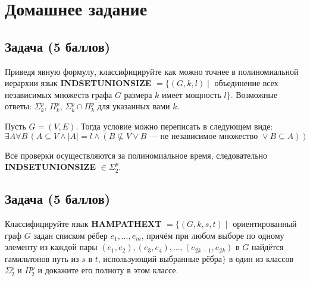 \section{Домашнее задание}

\subsection{\textbf{Задача (5 баллов)}}

Приведя явную формулу, классифицируйте как можно точнее в полиномиальной иерархии язык
\textbf{INDSETUNIONSIZE} $= \{(G, k, l) \mid$ объединение всех независимых множеств графа $G$ размера $k$ имеет мощность $l\}$.
Возможные ответы: $\Sigma_k^p$, $\Pi_k^p$, $\Sigma_k^p \cap \Pi_k^p$ для указанных вами $k$.

\begin{solution}
    Пусть $G = (V, E)$. Тогда условие можно переписать в следующем виде:
    $$\exists A \forall B \, (A \subseteq V \wedge |A| = l \wedge (B \nsubseteq V \vee B \text{ --- не независимое множество } \vee B \subseteq A))$$

    Все проверки осуществляются за полиномиальное время, следовательно \textbf{INDSETUNIONSIZE} $\in \Sigma_2^p$.

\end{solution}


\subsection{Задача \textbf{(5 баллов)}}

Классифицируйте язык \textbf{HAMPATHEXT} $= \{(G, k, s, t) \mid$ ориентированный граф $G$ задан списком рёбер
$e_1, \ldots, e_m$, причём при любом выборе по одному элементу из каждой пары $(e_1, e_2), (e_3, e_4), \ldots, (e_{2k-1}, e_{2k})$
в $G$ найдётся гамильтонов путь из $s$ в $t$, использующий выбранные рёбра$\}$ в один из классов
$\Sigma_2^p$ и $\Pi_2^p$ и докажите его полноту в этом классе.

